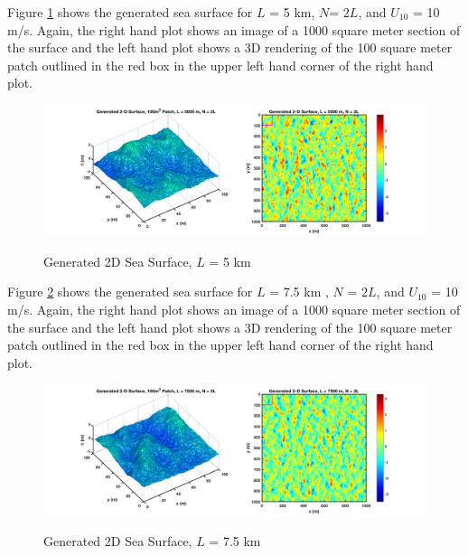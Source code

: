 Figure \ref{os_fig:11} shows the generated sea surface for $L$ = 5 km, $N$= $2L$, and $U_{10}$ = 10 m/s. Again, the right hand plot shows an image of a 1000 square meter section of the surface and the left hand plot shows a 3D rendering of the 100 square meter patch outlined in the red box in the upper left hand corner of the right hand plot.
\begin{figure}[H]
  \begin{center}
\includegraphics[width=6in]{../media/Ocean_Surface/sea_surface_2d_surf_5000.png}
  \end{center}
  \renewcommand{\baselinestretch}{1} \small\normalsize
  \begin{quote}
    \caption[Generated 2D Sea Surface, $L$ = 5 km]{Generated 2D Sea Surface, $L$ = 5 km \label{os_fig:11}}
  \end{quote}
\end{figure}
\renewcommand{\baselinestretch}{2} \small\normalsize

Figure \ref{os_fig:12} shows the generated sea surface for $L$ = 7.5 km , $N$ = $2L$, and $U_{10}$ = 10 m/s. Again, the right hand plot shows an image of a 1000 square meter section of the surface and the left hand plot shows a 3D rendering of the 100 square meter patch outlined in the red box in the upper left hand corner of the right hand plot.
\begin{figure}[H]
  \begin{center}
\includegraphics[width=6in]{../media/Ocean_Surface/sea_surface_2d_surf_7500.png}
  \end{center}
  \renewcommand{\baselinestretch}{1} \small\normalsize
  \begin{quote}
    \caption[Generated 2D Sea Surface, $L$ = 7.5 km]{Generated 2D Sea Surface, $L$ = 7.5 km \label{os_fig:12}}
  \end{quote}
\end{figure}
\renewcommand{\baselinestretch}{2} \small\normalsize

